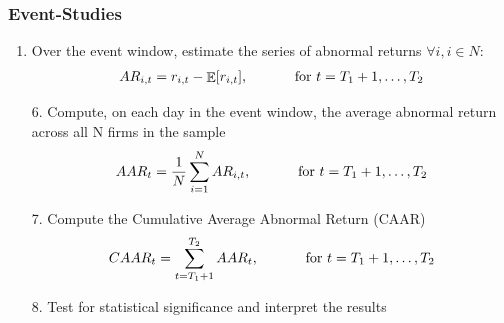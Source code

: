 \documentclass[xcolor=dvipsnames, english, 8pt]{beamer}
\DeclareMathOperator{\E}{\mathbb{E}}
\begin{document}
\begin{frame}[label=event_studies_main]
    \frametitle{Event-Studies}
    \begin{enumerate}[5.]
        \item Over the  {\color{ubRed}event window}, estimate the series of abnormal returns $\forall i, i\in N$:
        \begin{align}
            AR_{i,t} = r_{i,t} - \E[r_{i,t}] \text{, \hspace{1cm} for } t=T_1+1, \hdots, T_2
        \end{align}
        \item[6.] Compute, on each day in the event window, the average abnormal return across all
N firms in the sample
\begin{align}
    AAR_{t} = \frac{1}{N}\sum\limits_{i=1}^N AR_{i,t} \text{, \hspace{1cm} for } t=T_1+1, \hdots, T_2
\end{align}
\item[7.] Compute the  {\color{ubRed} Cumulative Average Abnormal Return} (CAAR)
\begin{align}
    CAAR_{t} = \sum\limits_{t=T_1+1}^{T_{2}} AAR_t \text{, \hspace{1cm} for } t=T_1+1, \hdots, T_2
\end{align}
\item[8.] Test for statistical significance and interpret the results\vspace{0.25cm}\\
    \end{enumerate}
       \end{frame}
\end{document}
